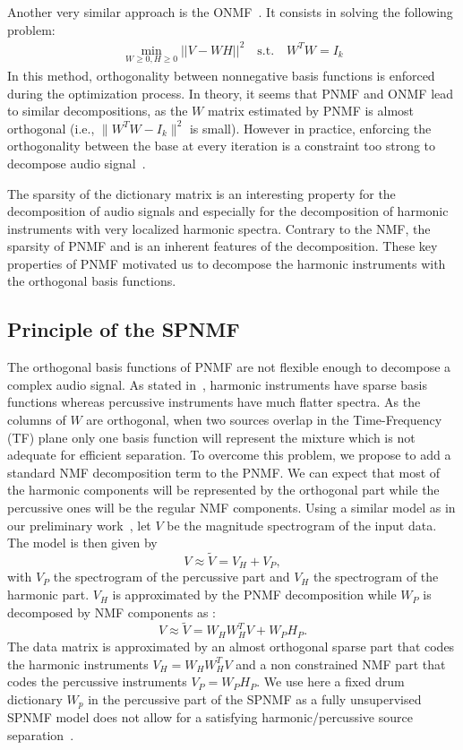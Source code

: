 \documentclass{article}
\begin{document}
Another very similar approach is the ONMF~\cite{choi}. It consists in solving the following problem: 
\begin{align}
\min_{W \geqslant 0, H \geqslant0} ||V - WH||^2 \quad   \text{s.t}.\quad W^{T}W=I_{k} 
\end{align}%
In this method, orthogonality between nonnegative basis functions is enforced during the optimization process. In theory, it seems that PNMF and ONMF lead to similar decompositions, as the $W$ matrix estimated by PNMF is almost orthogonal (i.e., $\|W^{T}W-I_{k}\|^{2}$ is small). However in practice, enforcing the orthogonality between the base at every iteration is a constraint too strong to decompose audio signal~\cite{laroche2015structured}. 

The sparsity of the dictionary matrix is an interesting property for the decomposition of audio signals and especially for the decomposition of harmonic instruments with very localized harmonic spectra. Contrary to the NMF, the sparsity of PNMF and is an inherent features of the decomposition. These key properties of PNMF motivated us to decompose the harmonic instruments with the orthogonal basis functions.


\subsection{Principle of the SPNMF}

The orthogonal basis functions of PNMF are not flexible enough to decompose a complex audio signal. As stated in~\cite{canadas2014percussive}, harmonic instruments have sparse basis functions whereas percussive instruments have much flatter spectra. As the columns of $W$ are orthogonal, when two sources overlap in the Time-Frequency (TF) plane only one basis function will represent the mixture which is not adequate for efficient separation. To overcome this problem, we propose to add a standard NMF decomposition term to the PNMF. We can expect that most of the harmonic components will be represented by the orthogonal part while the percussive ones will be the regular NMF components. Using a similar model as in our preliminary work~\cite{laroche2015structured}, let $V$ be the magnitude spectrogram of the input data. The model is then given by
\begin{equation} \label{Cfunction}
V \approx \tilde{V}= V_H + V_{P},
\end{equation}
with $V_P$ the spectrogram of the percussive part and $V_H$ the spectrogram of the harmonic part. $V_H$ is approximated by the PNMF decomposition while $W_P$ is decomposed by NMF components as :
\begin{equation}
V \approx \tilde{V}= W_{H}W_{H}^{T}V + W_{P} H_{P}.
\end{equation}
The data matrix is approximated by an almost orthogonal sparse part that codes the harmonic instruments $V_H = W_HW_H^T V$ and a non constrained NMF part that codes the percussive instruments $V_P = W_PH_P$. We use here a fixed drum dictionary $W_p$ in the percussive part of the SPNMF as a fully unsupervised SPNMF model does not allow for a satisfying harmonic/percussive source separation~\cite{laroche2015structured}.
\end{document}
